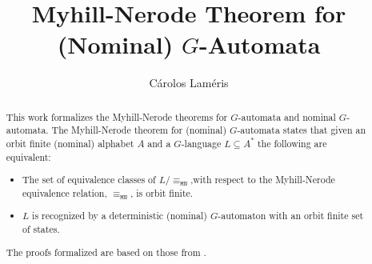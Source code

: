 \documentclass[11pt,a4paper]{article}
\begin{document}
\title{Myhill-Nerode Theorem for (Nominal) $G$-Automata}
\author{C\'{a}rolos Lam\'{e}ris}
\maketitle

\begin{abstract}
This work formalizes the Myhill-Nerode theorems for $G$-automata and nominal $G$-automata.
The Myhill-Nerode theorem for (nominal) $G$-automata states that given an orbit finite (nominal) alphabet $A$ and a $G$-language $L \subseteq A^{\ast}$ the following are equivalent:
\begin{itemize}
\item
    The set of equivalence classes of $L{/}\equiv_{\texttt{MN}}$,with respect to the Myhill-Nerode equivalence relation, $\equiv_{\texttt{MN}}$, is orbit finite.
\item
    $L$ is recognized by a deterministic (nominal) $G$-automaton with an orbit finite set of states.
\end{itemize}

The proofs formalized are based on those from \cite{bojanczyk2014automata}.
\end{abstract}

\tableofcontents





\end{document}
